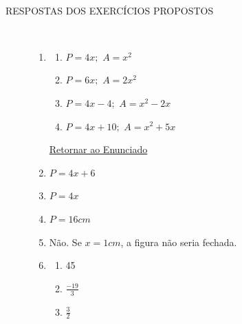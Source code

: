 ~~

\setcounter{tempi}{0}
\begin{description}
    \item [{\large RESPOSTAS DOS EXERCÍCIOS PROPOSTOS}] ~~
    \begin{enumerate}[label=\textbf{\thesection.\thetempi.\thetempii}]
        \setcounter{tempii}{0}
        
        \label{r:3.1.1}
        \item \begin{multicols}{2}
            \begin{enumerate}[label=\alph*)]
                \item $P = 4x;$ $A = x^2$
            
                \item $P = 6x;$ $A = 2x^2$
            
                \item $P = 4x-4;$ $A = x^2-2x$
                
                \item $P = 4x+10;$ $A = x^2+5x$
            \end{enumerate}
        \end{multicols}
        \hyperref[e:3.1.1]{Retornar ao Enunciado}        
        \item $P = 4x+6$
        
        \item $P=4x$
        
        \item $P = 16 cm$
        
        \item Não. Se $x = 1 cm$, a figura não seria fechada.
        
        \item \begin{multicols}{4}
            \begin{enumerate}[label=\alph*)]
                \item 45
            
                \item $\frac{-19}{3}$
            
                \item $\frac{3}{2}$
                

\end{enumerate}
\end{multicols}
\end{enumerate}
\end{description}
